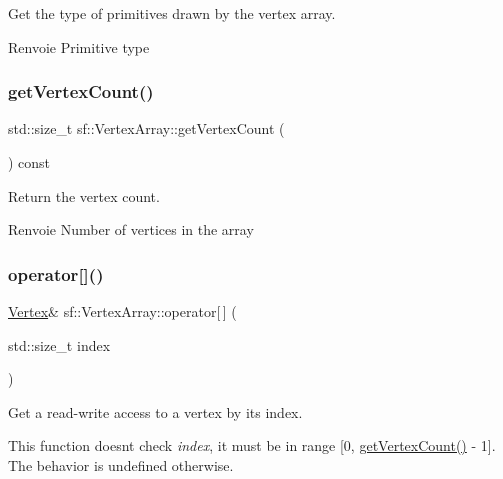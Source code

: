Get the type of primitives drawn by the vertex array. 

\begin{DoxyReturn}{Renvoie}
Primitive type 
\end{DoxyReturn}
\mbox{\label{classsf_1_1VertexArray_abda90e8d841a273d93164f0c0032bd8d}} 
\subsubsection{\texorpdfstring{get\+Vertex\+Count()}{getVertexCount()}}
{\footnotesize\ttfamily std\+::size\+\_\+t sf\+::\+Vertex\+Array\+::get\+Vertex\+Count (\begin{DoxyParamCaption}{ }\end{DoxyParamCaption}) const}



Return the vertex count. 

\begin{DoxyReturn}{Renvoie}
Number of vertices in the array 
\end{DoxyReturn}
\mbox{\label{classsf_1_1VertexArray_a6006676417d91f42d0278f1abcfe4352}} 
\subsubsection{\texorpdfstring{operator[]()}{operator[]()}\hspace{0.1cm}{\footnotesize\ttfamily [1/2]}}
{\footnotesize\ttfamily \hyperlink{classsf_1_1Vertex}{Vertex}\& sf\+::\+Vertex\+Array\+::operator\mbox{[}$\,$\mbox{]} (\begin{DoxyParamCaption}\item[{std\+::size\+\_\+t}]{index }\end{DoxyParamCaption})}



Get a read-\/write access to a vertex by its index. 

This function doesn\textquotesingle{}t check {\itshape index}, it must be in range \mbox{[}0, \hyperlink{classsf_1_1VertexArray_abda90e8d841a273d93164f0c0032bd8d}{get\+Vertex\+Count()} -\/ 1\mbox{]}. The behavior is undefined otherwise.


